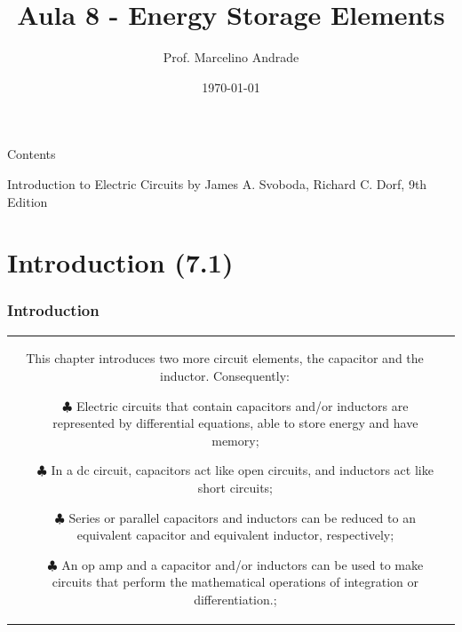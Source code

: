 \documentclass[aspectratio=169]{beamer}
\title[\sc{Teoria de Circuitos Eletrônicos 1}]{\LARGE Aula 8 - Energy Storage Elements}
\author[Prof. Marcelino Andrade]{Prof. Marcelino Andrade}
\institute{Faculdade UnB Gama} %
\date{\today}
\begin{document}
\justifying %
\pagebreak

\begin{frame}
  \titlepage
\end{frame}


\begin{frame}{Contents}

\tableofcontents
     		Introduction to Electric Circuits by James A. Svoboda, Richard C. Dorf, 9th Edition 
\end{frame}

\section{Introduction (7.1)}
\begin{frame}[fragile]
	\frametitle{Introduction}
		\begin{tabular}{cc}
			\begin{columns}
				\begin{column}{1\textwidth}  %
					This chapter introduces two more circuit elements, the capacitor and the inductor. Consequently:	
		
					\begin{itemize}
						\item[$\clubsuit$]{Electric circuits that contain capacitors and/or inductors are represented by differential equations, able to store energy and have memory;}
						\item[$\clubsuit$]{In a dc circuit, capacitors act like open circuits, and inductors act like short circuits;}
						\item[$\clubsuit$]{Series or parallel capacitors and inductors can be reduced to an equivalent capacitor and equivalent inductor, respectively;}	
						\item[$\clubsuit$]{An op amp and a capacitor and/or inductors can be used to make circuits that perform the mathematical operations of
integration or differentiation.;}	
					\end{itemize}
					
				\end{column}
			\end{columns}
		
	\end{tabular}
\end{frame}
\end{document}
